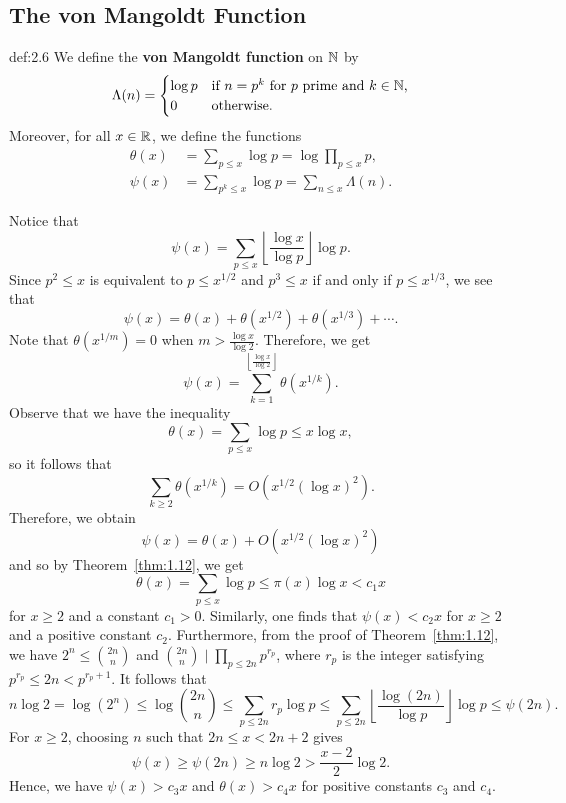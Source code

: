 \newpage 
\subsection{The von Mangoldt Function}\label{subsec:2.2}

\vspace{2ex}
\begin{defn}{def:2.6}
We define the {\bf von Mangoldt function} on $\mathbb{N}$ by 
\[ \Lambda(n) = \begin{cases} \log p & \text{if $n = p^k$ for $p$ prime and $k \in \mathbb{N}$,} \\ 0 & \text{otherwise.} \end{cases} \]
Moreover, for all $x \in \mathbb{R}$, we define the functions 
\begin{align*}
    \theta(x) &= \sum_{p\leq x} \log p = \log \prod_{p \leq x} p, \\ 
    \psi(x) &= \sum_{p^k \leq x} \log p = \sum_{n \leq x} \Lambda(n). 
\end{align*}
\end{defn}

Notice that 
\[ \psi(x) = \sum_{p\leq x} \left\lfloor \frac{\log x}{\log p} \right\rfloor \log p. \]
Since $p^2 \leq x$ is equivalent to $p \leq x^{1/2}$ and $p^3 \leq x$ if and only if $p \leq x^{1/3}$, 
we see that 
\[ \psi(x) = \theta(x) + \theta(x^{1/2}) + \theta(x^{1/3}) + \cdots. \]
Note that $\theta(x^{1/m}) = 0$ when $m > \frac{\log x}{\log 2}$. Therefore, we get 
\[ \psi(x) = \sum_{k=1}^{\left\lfloor \frac{\log x}{\log 2} \right\rfloor} \theta(x^{1/k}). \]
Observe that we have the inequality 
\[ \theta(x) = \sum_{p\leq x} \log p \leq x \log x, \]
so it follows that 
\[ \sum_{k \geq 2} \theta(x^{1/k}) = O\left( x^{1/2} (\log x)^2 \right). \]
Therefore, we obtain 
\[ \psi(x) = \theta(x) + O\left( x^{1/2} (\log x)^2 \right) \]
and so by Theorem~\ref{thm:1.12}, we get 
\[ \theta(x) = \sum_{p\leq x}\log p \leq \pi(x) \log x < c_1 x \]
for $x \geq 2$ and a constant $c_1 > 0$. Similarly, one finds that $\psi(x) < c_2x$ for $x \geq 2$
and a positive constant $c_2$. Furthermore, from the proof of Theorem~\ref{thm:1.12}, we have $2^n \leq \binom{2n}n$
and $\binom{2n}n \mid \prod_{p \leq 2n} p^{r_p}$, where $r_p$ is the integer satisfying 
$p^{r_p} \leq 2n < p^{r_p+1}$. It follows that 
\[ n\log 2 = \log(2^n) \leq \log \binom{2n}n \leq \sum_{p\leq 2n} r_p \log p \leq 
\sum_{p \leq 2n} \left\lfloor \frac{\log(2n)}{\log p} \right\rfloor \log p \leq \psi(2n). \]
For $x \geq 2$, choosing $n$ such that $2n \leq x < 2n+2$ gives 
\[ \psi(x) \geq \psi(2n) \geq n\log 2 > \frac{x-2}2 \log 2. \]
Hence, we have $\psi(x) > c_3x$ and $\theta(x) > c_4x$ for positive constants $c_3$ and $c_4$. 

